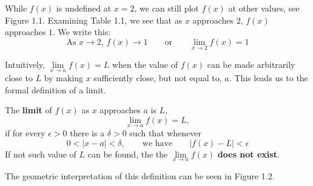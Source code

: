 While $f(x)$ is undefined at $x = 2$, we can still plot $f(x)$ at other 
values, see Figure 1.1. Examining Table 1.1, we see that as $x$ 
approaches $2$, $f(x)$ approaches $1$. We write this:
$$\text{As  } x \to 2\text{,  }f(x) \to 1
\qquad\text{or}\qquad
\lim_{x\to 2} f(x) = 1$$

Intuitively, $\lim\limits_{x\to a} f(x) = L$ when the value of $f(x)$ can be 
made arbitrarily close to $L$ by making $x$ sufficiently close, but not 
equal to, $a$. This leads us to the formal definition of a limit.


\begin{definition}[Limit]
	The \textbf{limit} of $f(x)$ as $x$ approaches $a$ is $L$,
	$$\lim_{x\to a} f(x) = L,$$
	if for every $\epsilon > 0$ there is a $\delta > 0$ such that 
	whenever
	$$0 < |x-a| < \delta,
	\qquad\text{we have}\qquad
	|f(x) - L| < \epsilon$$
	If not such value of $L$ can be found, the the $\lim\limits_{x\to a} f(x)$
	\textbf{does not exist}.
\end{definition}

The geometric interpretation of this definition can be seen in 
Figure 1.2.


